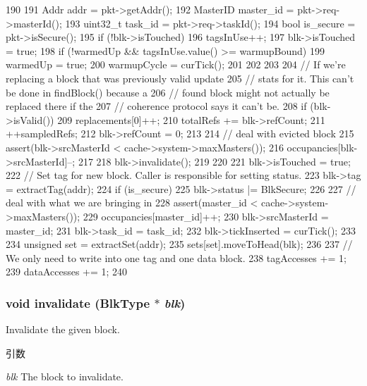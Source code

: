 \begin{DoxyCode}
190 {
191     Addr addr = pkt->getAddr();
192     MasterID master_id = pkt->req->masterId();
193     uint32_t task_id = pkt->req->taskId();
194     bool is_secure = pkt->isSecure();
195     if (!blk->isTouched) {
196         tagsInUse++;
197         blk->isTouched = true;
198         if (!warmedUp && tagsInUse.value() >= warmupBound) {
199             warmedUp = true;
200             warmupCycle = curTick();
201         }
202     }
203 
204     // If we're replacing a block that was previously valid update
205     // stats for it. This can't be done in findBlock() because a
206     // found block might not actually be replaced there if the
207     // coherence protocol says it can't be.
208     if (blk->isValid()) {
209         replacements[0]++;
210         totalRefs += blk->refCount;
211         ++sampledRefs;
212         blk->refCount = 0;
213 
214         // deal with evicted block
215         assert(blk->srcMasterId < cache->system->maxMasters());
216         occupancies[blk->srcMasterId]--;
217 
218         blk->invalidate();
219     }
220 
221     blk->isTouched = true;
222     // Set tag for new block.  Caller is responsible for setting status.
223     blk->tag = extractTag(addr);
224     if (is_secure)
225         blk->status |= BlkSecure;
226 
227     // deal with what we are bringing in
228     assert(master_id < cache->system->maxMasters());
229     occupancies[master_id]++;
230     blk->srcMasterId = master_id;
231     blk->task_id = task_id;
232     blk->tickInserted = curTick();
233 
234     unsigned set = extractSet(addr);
235     sets[set].moveToHead(blk);
236 
237     // We only need to write into one tag and one data block.
238     tagAccesses += 1;
239     dataAccesses += 1;
240 }
\end{DoxyCode}
\hypertarget{classLRU_a11ea27715371eaeb125996e0a9ce14ab}{
\subsubsection[{invalidate}]{\setlength{\rightskip}{0pt plus 5cm}void invalidate ({\bf BlkType} $\ast$ {\em blk})}}
\label{classLRU_a11ea27715371eaeb125996e0a9ce14ab}
Invalidate the given block. 
\begin{DoxyParams}{引数}
\item[{\em blk}]The block to invalidate. \end{DoxyParams}



